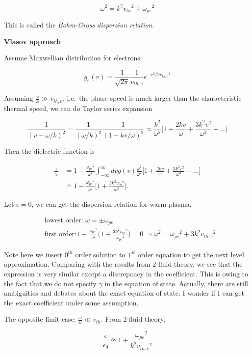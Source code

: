 \documentclass[
  notoc %
]{tufte-book}
\begin{document}
\[
\omega^2=k^2{v_{th}}^2+{\omega_{pe}}^2
\]

This is called the \emph{Bohm-Gross dispersion relation}.

\textbf{Vlasov approach}

Assume Maxwellian distribution for electrons:

\[
g_e(v)=\frac{1}{\sqrt{2\pi}}\frac{1}{v_{th,e}}e^{-v^2/2{v_{th,e}}^2}
\]

Assuming \(\frac{\omega}{k}\gg v_{th,e}\), i.e.~the phase speed is much
larger than the characteristic thermal speed, we can do Taylor series
expansion

\[
\frac{1}{(v-\omega/k)^2}=\frac{1}{(\omega/k)^2}\frac{1}{(1-kv/\omega)^2}\approx \frac{k^2}{\omega^2}\Big[ 1+\frac{2kv}{\omega}+\frac{3k^2v^2}{\omega^2}+...\Big]
\]

Then the dielectric function is

\[
\begin{aligned}
\frac{\epsilon}{\epsilon_0}&=1-\frac{{\omega_{pe}}^2}{k^2}\int_{-\infty}^{\infty}dv g(v)\frac{k^2}{\omega^2}\Big[ 1+\frac{2kv}{\omega}+\frac{3k^2v^2}{\omega^2}+...\Big] \\
&\doteq 1-\frac{{\omega_{pe}}^2}{\omega^2}\Big[ 1+\frac{3k^2{v_{th}}^2}{\omega^2} \Big] .
\end{aligned}
\]

Let \(\epsilon=0\), we can get the dispersion relation for warm plasma,

\[
\begin{aligned}
&\text{lowest order: } \omega=\pm \omega_{pe} \\
&\text{first order:} 1-\frac{{\omega_{pe}}^2}{\omega^2}\Big( 1+\frac{3k^2{v_{th}}^2}{{\omega_{pe}}^2}\Big)=0\Rightarrow \omega^2={\omega_{pe}}^2+3k^2{v_{th,e}}^2
\end{aligned}
\]

Note here we insert \(0^{th}\) order solution to \(1^{st}\) order
equation to get the next level approximation. Comparing with the results
from 2-fluid theory, we see that the expression is very similar except a
discrepancy in the coefficient. This is owing to the fact that we do not
specify \(\gamma\) in the equation of state. Actually, there are still
ambiguities and debates about the exact equation of state. I wonder if I
can get the exact coefficient under some assumption.

The opposite limit case: \(\frac{\omega}{k}\ll v_{th}\). From 2-fluid
theory,

\[
\frac{\epsilon}{\epsilon_0}\approxeq1+\frac{{\omega_{pe}}^2}{k^2{v_{th,e}}^2}
\]
\end{document}
